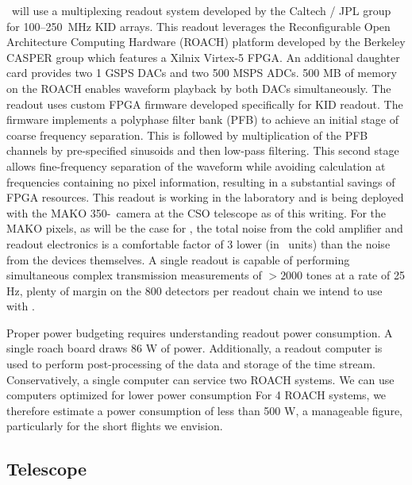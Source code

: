 \name\ will use a multiplexing readout system developed by the Caltech / JPL group for 100--250~MHz KID arrays.  This readout leverages the Reconfigurable Open Architecture Computing Hardware (ROACH) platform developed by the Berkeley CASPER group which features a Xilnix Virtex-5 FPGA.  An additional daughter card provides two 1 GSPS DACs and two 500 MSPS ADCs.  500 MB of memory on the ROACH enables waveform playback by both DACs simultaneously.  The readout uses custom FPGA firmware developed specifically for KID readout.  The firmware implements a polyphase filter bank (PFB) to achieve an initial stage of coarse frequency separation.  This is followed by multiplication of the PFB channels by pre-specified sinusoids and then low-pass filtering.  This second stage allows fine-frequency separation of the waveform while avoiding calculation at frequencies containing no pixel information, resulting in a substantial savings of FPGA resources.  This readout is working in the laboratory and is being deployed with 
the MAKO 350-\mum\ camera at the CSO telescope as of this writing.  For the MAKO pixels, as will be the case for \name, the total noise from the cold amplifier and readout electronics is a comfortable factor of 3 lower (in \Sxx\ units) than the noise from the devices themselves.   A single readout is capable of performing simultaneous complex transmission measurements of $>2000$ tones at a rate of 25 Hz, plenty of margin on the 800 detectors per readout chain we intend to use with \name.

Proper power budgeting requires understanding readout power consumption.  A single roach board draws 86 W of power.  Additionally, a readout computer 
is used to perform post-processing of the data and storage of the time stream.  Conservatively, a single computer can service two ROACH systems.  We can use computers optimized for lower power consumption  For 4 ROACH systems, we therefore estimate a power consumption of less than 500 W, a manageable figure, particularly for the short flights we envision.  

\subsection{Telescope}
\label{sec:Telescope}

